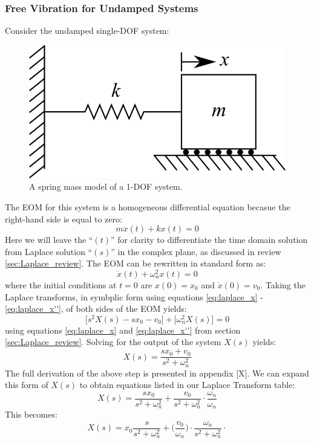 \documentclass[12pt,letter]{article}
\numberwithin{ex}{section} %
\numberwithin{re}{section} %
\begin{document}
			\subsubsection{Free Vibration for Undamped Systems}
			Consider the undamped single-DOF system:
			\begin{figure}[H]
				\centering
				\includegraphics[]{../figures/1-DOF-spring_mass_horizontal.png}
				\caption{A spring mass model of a 1-DOF system.}
			\end{figure}
			\noindent The EOM for this system is a homogeneous differential equation becasue the right-hand side is equal to zero:
			\begin{equation}
				m\ddot{x}(t) + kx(t) = 0 
			\end{equation}
			Here we will leave the ``$(t)$'' for clarity to differentiate the time domain solution from Laplace solution ``$(s)$'' in the complex plane, as discussed in review \ref{sec:Laplace_review}. The EOM can be rewritten in standard form as:
			\begin{equation}
				\ddot{x}(t) + \omega_n^2x(t) = 0 
			\end{equation}
			where the initial conditions at $t=0$ are $x(0)=x_0$ and $\dot{x}(0) = v_0$. Taking the Laplace transforms, in symbplic form using equations \ref{eq:laplace_x} - \ref{eq:laplace_x''}, of both sides of the EOM yields:
			\begin{equation}
				\big[s^2X(s) -sx_0 -v_0 \big] + \big[ \omega_n^2X(s) \big] =0
			\end{equation}
			using equations \ref{eq:laplace_x} and \ref{eq:laplace_x''} from section \ref{sec:Laplace_review}. Solving for the output of the system $X(s)$ yields:
			\begin{equation}
			X(s) = \frac{sx_0 + v_0}{s^2 + \omega_n^2}
			\end{equation}
			The full derivation of the above step is presented in appendix [X]. We can expand this form of $X(s)$ to obtain equations listed in our Laplace Transform table:
			\begin{equation}
			X(s) = \frac{sx_0}{s^2 + \omega_n^2} + \frac{v_0}{s^2 + \omega_n^2}\cdot \frac{\omega_n}{\omega_n}
			\end{equation}
			This becomes:
			\begin{equation}
			X(s) = x_0\frac{s}{s^2 + \omega_n^2} + \bigg(\frac{v_0}{\omega_n}\bigg) \cdot \frac{\omega_n}{s^2 + \omega_n^2}\cdot 
			\end{equation}
			
\end{document}
